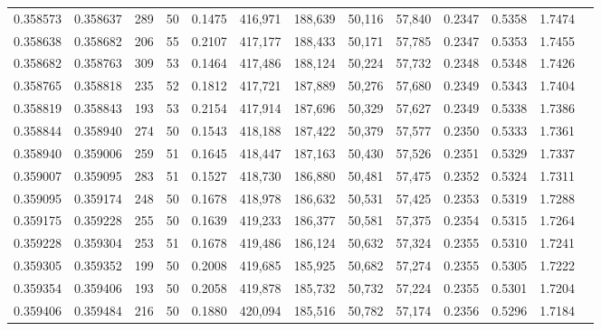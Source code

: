 \begin{tabular}{rrrrrrrrrrrrr}
0.358573 & 0.358637 &   289 &  50 &                                     0.1475 & 416,971 & 188,639 &  50,116 &  57,840 & 0.2347 & 0.5358 & 1.7474 \\
0.358638 & 0.358682 &   206 &  55 &                                     0.2107 & 417,177 & 188,433 &  50,171 &  57,785 & 0.2347 & 0.5353 & 1.7455 \\
0.358682 & 0.358763 &   309 &  53 &                                     0.1464 & 417,486 & 188,124 &  50,224 &  57,732 & 0.2348 & 0.5348 & 1.7426 \\
0.358765 & 0.358818 &   235 &  52 &                                     0.1812 & 417,721 & 187,889 &  50,276 &  57,680 & 0.2349 & 0.5343 & 1.7404 \\
0.358819 & 0.358843 &   193 &  53 &                                     0.2154 & 417,914 & 187,696 &  50,329 &  57,627 & 0.2349 & 0.5338 & 1.7386 \\
0.358844 & 0.358940 &   274 &  50 &                                     0.1543 & 418,188 & 187,422 &  50,379 &  57,577 & 0.2350 & 0.5333 & 1.7361 \\
0.358940 & 0.359006 &   259 &  51 &                                     0.1645 & 418,447 & 187,163 &  50,430 &  57,526 & 0.2351 & 0.5329 & 1.7337 \\
0.359007 & 0.359095 &   283 &  51 &                                     0.1527 & 418,730 & 186,880 &  50,481 &  57,475 & 0.2352 & 0.5324 & 1.7311 \\
0.359095 & 0.359174 &   248 &  50 &                                     0.1678 & 418,978 & 186,632 &  50,531 &  57,425 & 0.2353 & 0.5319 & 1.7288 \\
0.359175 & 0.359228 &   255 &  50 &                                     0.1639 & 419,233 & 186,377 &  50,581 &  57,375 & 0.2354 & 0.5315 & 1.7264 \\
0.359228 & 0.359304 &   253 &  51 &                                     0.1678 & 419,486 & 186,124 &  50,632 &  57,324 & 0.2355 & 0.5310 & 1.7241 \\
0.359305 & 0.359352 &   199 &  50 &                                     0.2008 & 419,685 & 185,925 &  50,682 &  57,274 & 0.2355 & 0.5305 & 1.7222 \\
0.359354 & 0.359406 &   193 &  50 &                                     0.2058 & 419,878 & 185,732 &  50,732 &  57,224 & 0.2355 & 0.5301 & 1.7204 \\
0.359406 & 0.359484 &   216 &  50 &                                     0.1880 & 420,094 & 185,516 &  50,782 &  57,174 & 0.2356 & 0.5296 & 1.7184 \\

\end{tabular}
